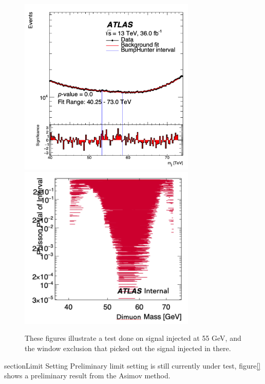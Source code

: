 \begin{figure}[!htb]
    \begin{center}
        \includegraphics[width=0.75\textwidth]{figures/chapter_dimuon/signalinjected}
        \includegraphics[width=0.75\textwidth]{figures/chapter_dimuon/signalinjected2}
        \caption{
        These figures illustrate a test done on signal injected at 55 GeV, and the window exclusion that picked out the signal injected in there.}
    \end{center}
\end{figure}

section{Limit Setting}
Preliminary limit setting is still currently under test, figure\ref{} shows a preliminary result from the Asimov method. 

